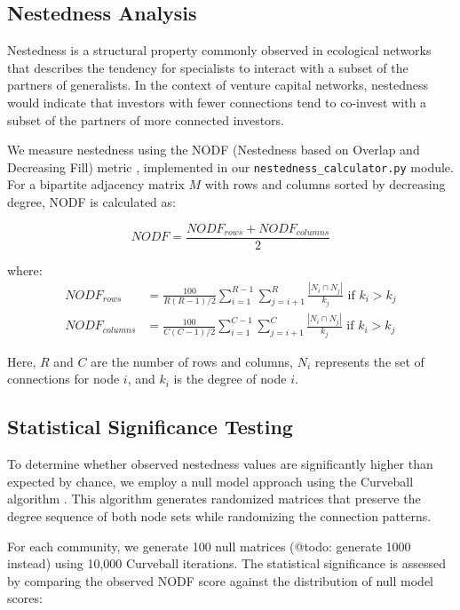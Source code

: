 \documentclass[12pt]{article}
\begin{document}
\subsection{Nestedness Analysis}

Nestedness is a structural property commonly observed in ecological networks \cite{AlmeidaNeto2008} that describes the tendency for specialists to interact with a subset of the partners of generalists. In the context of venture capital networks, nestedness would indicate that investors with fewer connections tend to co-invest with a subset of the partners of more connected investors.

We measure nestedness using the NODF (Nestedness based on Overlap and Decreasing Fill) metric \cite{AlmeidaNeto2008}, implemented in our \texttt{nestedness\_calculator.py} module. For a bipartite adjacency matrix $M$ with rows and columns sorted by decreasing degree, NODF is calculated as:

\begin{equation}
NODF = \frac{NODF_{rows} + NODF_{columns}}{2}
\end{equation}

where:
\begin{align}
NODF_{rows} &= \frac{100}{R(R-1)/2} \sum_{i=1}^{R-1} \sum_{j=i+1}^{R} \frac{|N_i \cap N_j|}{k_j} \text{ if } k_i > k_j \\
NODF_{columns} &= \frac{100}{C(C-1)/2} \sum_{i=1}^{C-1} \sum_{j=i+1}^{C} \frac{|N_i \cap N_j|}{k_j} \text{ if } k_i > k_j
\end{align}

Here, $R$ and $C$ are the number of rows and columns, $N_i$ represents the set of connections for node $i$, and $k_i$ is the degree of node $i$.

\subsection{Statistical Significance Testing}

To determine whether observed nestedness values are significantly higher than expected by chance, we employ a null model approach using the Curveball algorithm \cite{Strona2014}. This algorithm generates randomized matrices that preserve the degree sequence of both node sets while randomizing the connection patterns.

For each community, we generate 100 null matrices (@todo: generate 1000 instead) using 10,000 Curveball iterations. The statistical significance is assessed by comparing the observed NODF score against the distribution of null model scores:
\end{document}

